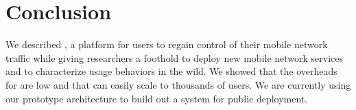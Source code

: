 \section{Conclusion}
We described \meddle, a platform for users to regain control of their mobile 
network traffic while giving researchers a foothold to deploy new mobile network 
services and to characterize usage behaviors in the wild. We showed that the overheads 
for \meddle are low and that \meddle can easily scale to thousands of users. We are currently using our  
prototype \meddle architecture to build out a system for public deployment.

